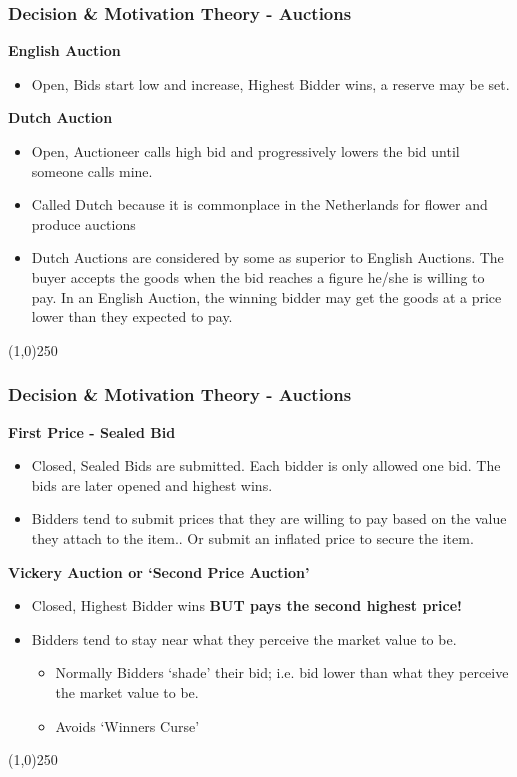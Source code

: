 \begin{frame}
\frametitle{Decision \& Motivation Theory -  Auctions}
\textbf{English Auction}\\
\begin{itemize}
\item Open, Bids start low and increase, Highest Bidder wins, a reserve may be set.
\end{itemize}
\textbf{Dutch Auction}\\
\begin{itemize}
	\item Open, Auctioneer calls high bid and progressively lowers the bid until someone calls mine.
	\item Called Dutch because it is commonplace in the Netherlands for flower and produce auctions
	\item Dutch Auctions are considered by some as superior to English Auctions.  The buyer accepts the goods when the bid reaches a figure he/she is willing to pay.  In an English Auction, the winning bidder may get the goods at a price lower than they expected to pay.
\end{itemize}
\end{frame}
\begin{center}\line(1,0){250}\end{center}



\begin{frame}
\frametitle{Decision \& Motivation Theory -  Auctions}
\textbf{First Price - Sealed Bid}\\
\begin{itemize}
	\item Closed, Sealed Bids are submitted.  Each bidder is only allowed one bid. The bids are later opened and highest wins.
	\item Bidders tend to submit prices that they are willing to pay based on the value they attach to the item.. Or submit an inflated price to secure the item.
\end{itemize}
\textbf{Vickery Auction or `Second Price Auction'}\\
\begin{itemize}
	\item Closed, Highest Bidder wins \textbf{BUT pays the second highest price!}
	\item Bidders tend to stay near what they perceive the market value to be.
\begin{itemize}
	\item Normally Bidders `shade' their bid; i.e. bid lower than what they perceive the market value to be.
	\item Avoids `Winners Curse'
\end{itemize}
\end{itemize}
\end{frame}
\begin{center}\line(1,0){250}\end{center}



